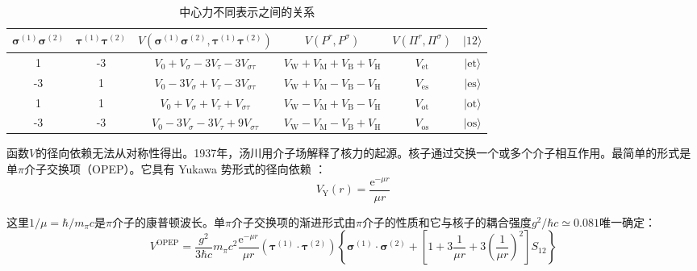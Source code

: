 \begin{table}[H]
\begin{centering}
\caption{\label{tab:=004E2D=005FC3=00529B=004E0D=00540C=008868=00793A=004E4B=0095F4=007684=005173=007CFB}中心力不同表示之间的关系}
\par\end{centering}
\centering{}%
\begin{tabular}{|c|c|c|c|c|c|}
\hline 
$\boldsymbol{\sigma}^{(1)}\boldsymbol{\sigma}^{(2)}$ & $\boldsymbol{\tau}^{(1)}\boldsymbol{\tau}^{(2)}$ & $V(\boldsymbol{\sigma}^{(1)}\boldsymbol{\sigma}^{(2)},\boldsymbol{\tau}^{(1)}\boldsymbol{\tau}^{(2)})$ & $V(P^{r},P^{\sigma})$ & $V(\Pi^{r},\Pi^{\sigma})$ & $|12\rangle$\tabularnewline
\hline 
\hline 
1 & -3 & $V_{0}+V_{\sigma}-3V_{\tau}-3V_{\sigma\tau}$ & $V_{\text{W}}+V_{\text{M}}+V_{\text{B}}+V_{\text{H}}$ & $V_{\text{et}}$ & $|\text{et}\rangle$\tabularnewline
\hline 
-3 & 1 & $V_{0}-3V_{\sigma}+V_{\tau}-3V_{\sigma\tau}$ & $V_{\text{W}}+V_{\text{M}}-V_{\text{B}}-V_{\text{H}}$ & $V_{\text{es}}$ & $|\text{es}\rangle$\tabularnewline
\hline 
1 & 1 & $V_{0}+V_{\sigma}+V_{\tau}+V_{\sigma\tau}$ & $V_{\text{W}}-V_{\text{M}}+V_{\text{B}}-V_{\text{H}}$ & $V_{\text{ot}}$ & $|\text{ot}\rangle$\tabularnewline
\hline 
-3 & -3 & $V_{0}-3V_{\sigma}-3V_{\tau}+9V_{\sigma\tau}$ & $V_{\text{W}}-V_{\text{M}}-V_{\text{B}}+V_{\text{H}}$ & $V_{\text{os}}$ & $|\text{os}\rangle$ \tabularnewline
\hline 
\end{tabular}
\end{table}

函数$V$的径向依赖无法从对称性得出。1937年，汤川用介子场解释了核力的起源。核子通过交换一个或多个介子相互作用。最简单的形式是单$\pi$介子交换项（OPEP）。它具有
Yukawa 势形式的径向依赖 \cite{Yu35}：
\[
V_{\text{Y}}(r)=\frac{\mathrm{e}^{-\mu r}}{\mu r}
\]

这里$1/\mu=\hbar/m_{\pi}c$是$\pi$介子的康普顿波长。单$\pi$介子交换项的渐进形式由$\pi$介子的性质和它与核子的耦合强度$g^{2}/\hbar c\simeq0.081$唯一确定：
\[
V^{\text{OPEP}}=\frac{g^{2}}{3\hbar c}m_{\pi}c^{2}\frac{\mathrm{e}^{-\mu r}}{\mu r}(\boldsymbol{\tau}^{(1)}\cdot\boldsymbol{\tau}^{(2)})\left\{ \boldsymbol{\sigma}^{(1)}\cdot\boldsymbol{\sigma}^{(2)}+\left[1+3\frac{1}{\mu r}+3\left(\frac{1}{\mu r}\right)^{2}\right]S_{12}\right\} 
\]

